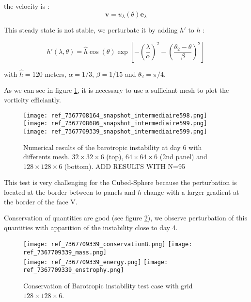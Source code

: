 the velocity is :
\begin{equation}
\mathbf{v} = u_{\lambda}(\theta) \mathbf{e}_{\lambda}
\label{eq:G1 velocity}
\end{equation}

This steady state is not stable, we perturbate it by adding $h'$ to $h$ :

\begin{equation}
h'(\lambda, \theta) = \hat{h} \cos (\theta) \exp \left[ - \left( \dfrac{\lambda}{\alpha} \right)^2 - \left( \dfrac{\theta_2 - \theta}{\beta} \right)^2 \right] 
\end{equation}

with $\hat{h} = 120$ meters, $\alpha = 1/3$, $\beta = 1/15$ and $\theta_2 = \pi/4$.

As we can see in figure \ref{fig:G1 snaphot}, it is necessary to use a sufficiant mesh to plot the vorticity efficiantly. 

\begin{figure}
\texttt{[image: ref\_7367708164\_snapshot\_intermediaire598.png]}\\
\texttt{[image: ref\_7367708686\_snapshot\_intermediaire599.png]}\\
\texttt{[image: ref\_7367709339\_snapshot\_intermediaire599.png]}
\caption{Numerical results of the barotropic instability at day 6 with differents mesh. $32 \times 32 \times 6$ (top), $64 \times 64 \times 6$ (2nd panel) and $128 \times 128 \times 6$ (bottom). ADD RESULTS WITH N=95}
\label{fig:G1 snaphot}
\end{figure}

This test is very challenging for the Cubed-Sphere because the perturbation is  located at the border between to panels and $h$ change with a larger gradient at the border of the face V.

Conservation of quantities are good (see figure \ref{fig:G1 conservation}), we observe perturbation of this quantities with apparition of the instability close to day 4.

\begin{figure}
\texttt{[image: ref\_7367709339\_conservationB.png]}
\texttt{[image: ref\_7367709339\_mass.png]}\\
\texttt{[image: ref\_7367709339\_energy.png]}
\texttt{[image: ref\_7367709339\_enstrophy.png]}
\caption{Conservation of Barotropic instability test case with grid  $128 \times 128 \times 6$.}
\label{fig:G1 conservation}
\end{figure}